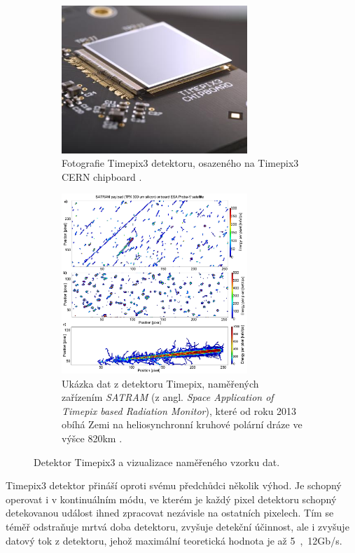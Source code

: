 \begin{figure}[bh]
    \begin{center}
        \begin{subfigure}{7.0cm}
            \includegraphics[width=7cm]{figures/timepix3.jpg}    
            \caption{Fotografie Timepix3 detektoru, osazeného na Timepix3 CERN chipboard \cite{medipix_from_medical_img_to_space}.}
        \end{subfigure}
        \hspace{0.1cm}
        \begin{subfigure}{7.0cm}
            \includegraphics[width=7cm]{figures/timepix_data_satram.png}    
            \caption{Ukázka dat z detektoru Timepix, naměřených zařízením \textit{SATRAM} (z angl. \textit{Space Application of Timepix based Radiation Monitor}), které od roku 2013 obíhá Zemi na heliosynchronní kruhové polární dráze ve výšce \unit{820}{km} \cite{PlatkevicDisertace}.}
        \end{subfigure}
	\end{center}
    \caption{Detektor Timepix3 a vizualizace naměřeného vzorku dat.}
	\label{fig:master:frontend:detector_detail}
\end{figure}

Timepix3 detektor přináší oproti svému předchůdci několik výhod. Je schopný operovat i v kontinuálním módu, ve kterém je každý pixel detektoru schopný detekovanou událost ihned zpracovat nezávisle na ostatních pixelech. Tím se téměř odstraňuje mrtvá doba detektoru, zvyšuje detekční účinnost, ale i zvyšuje datový tok z detektoru, jehož maximální teoretická hodnota je až \unit{5,12}{Gb/s}.

